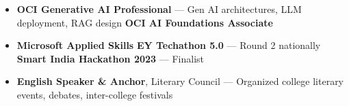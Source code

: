 \documentclass[10pt]{article}
\newcommand{\xfill}[2][1ex]{
    \dimen0=#2\advance\dimen0 by #1
    \leaders\hrule height \dimen0 depth -#1\hfill
}
\renewcommand{\section}[1]{
    \vspace{3pt}
    {\color{RoyalBlue}{\normalsize\scshape\raggedright #1\xfill[0pt]{0.5pt}}}
    \vspace{1pt}
}
\begin{document}
\section{Certifications \& Achievements}
\vspace{2pt}
\begin{itemize}[itemsep=-0.5mm]
    \item \textbf{OCI Generative AI Professional} --- Gen AI architectures, LLM deployment, RAG design \enspace\textbullet\enspace \textbf{OCI AI Foundations Associate}
    \item \textbf{Microsoft Applied Skills} \enspace\textbullet\enspace \textbf{EY Techathon 5.0} --- Round 2 nationally \enspace\textbullet\enspace \textbf{Smart India Hackathon 2023} --- Finalist
    \item \textbf{English Speaker \& Anchor}, Literary Council --- Organized college literary events, debates, inter-college festivals
\end{itemize}
\end{document}
